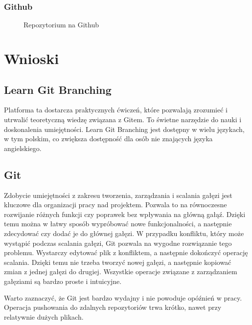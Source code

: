 \documentclass[a4paper,12pt]{article}
\begin{document}
\clearpage

\subsubsection{Github}

\begin{figure}[ht]
    \centering
    \vfill
    \caption{Repozytorium na Github}
\end{figure}

\newpage
\clearpage

\section{Wnioski}
\subsection{Learn Git Branching}
Platforma ta dostarcza praktycznych ćwiczeń, które pozwalają zrozumieć i utrwalić teoretyczną wiedzę związana z Gitem. To świetne narzędzie do nauki i doskonalenia umiejętności. Learn Git Branching jest dostępny w wielu językach, w tym polskim, co zwiększa dostępność dla osób nie znających języka angielskiego.

\subsection{Git}
Zdobycie umiejętności z zakresu tworzenia, zarządzania i scalania gałęzi jest kluczowe dla organizacji pracy nad projektem. Pozwala to na równoczesne rozwijanie różnych funkcji czy poprawek bez wpływania na główną gałąź. Dzięki temu można w łatwy sposób wypróbować nowe funkcjonalności, a następnie zdecydować czy dodać je do głównej gałęzi. W przypadku konfliktu, który może wystąpić podczas scalania gałęzi, Git pozwala na wygodne rozwiązanie tego problemu. Wystarczy edytować plik z konfliktem, a następnie dokończyć operację scalania. Dzięki temu nie trzeba tworzyć nowej gałęzi, a następnie kopiować zmian z jednej gałęzi do drugiej. Wszystkie operacje związane z zarządzaniem gałęziami są bardzo proste i intuicyjne.

Warto zaznaczyć, że Git jest bardzo wydajny i nie powoduje opóźnień w pracy. Operacja pushowania do zdalnych repozytoriów trwa krótko, nawet przy relatywnie dużych plikach.

\printbibliography
\nocite{*}
\end{document}
